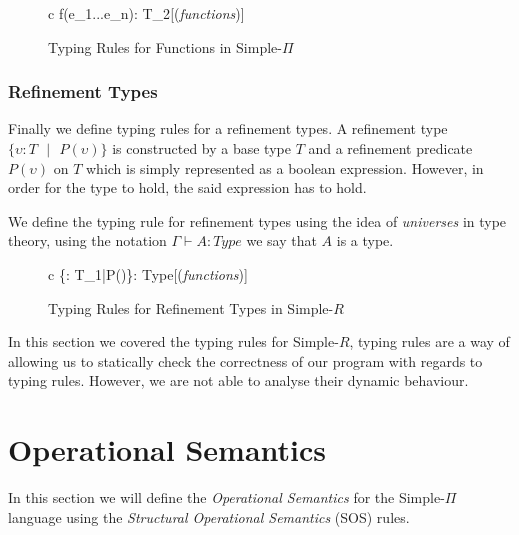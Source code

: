 \documentclass[a4paper,12pt]{report}
\begin{document}
\begin{figure}[H]
  \begin{center}
    \begin{tabular} {c}
        {\Gamma \vdash f(e_1...e_n): T_2}[(\textit{functions})]
    \end{tabular}
  \end{center}
  \caption{Typing Rules for Functions in Simple-$\Pi$}
\end{figure}

\subsubsection{Refinement Types}
Finally we define typing rules for a refinement types. A refinement type 
$\{\upsilon : T\text{ }|\text{ }P(\upsilon)\}$ is constructed by a base type $T$ 
and a refinement predicate $P(\upsilon)$ on $T$ which is 
simply represented as a boolean expression. However, in order for the type to 
hold, the said expression has to hold. 

\par
We define the typing rule for refinement types using the idea of 
\textit{universes} \cite{martinLof} in type theory, using the notation 
$\Gamma \vdash A : Type$ we say that $A$ is a type. 

\begin{figure}[H]
  \begin{center}
    \begin{tabular} {c}
        {\Gamma \vdash \{\upsilon : T_1\text{ }|\text{ }P(\upsilon)\}: Type}[(\textit{functions})]
    \end{tabular}
  \end{center}
  \caption{Typing Rules for Refinement Types in Simple-$R$}
\end{figure}

\par
In this section we covered the typing rules for Simple-$R$, typing rules are a 
way of allowing us to statically check the correctness of our program with 
regards to typing rules. However, we are not able to analyse their dynamic 
behaviour. 

\section{Operational Semantics}
In this section we will define the \textit{Operational Semantics} 
\cite{operationalSemantics} for the Simple-$\Pi$ language 
using the \textit{Structural Operational Semantics} \cite{plotkinSOS} (SOS) rules.
\end{document}

